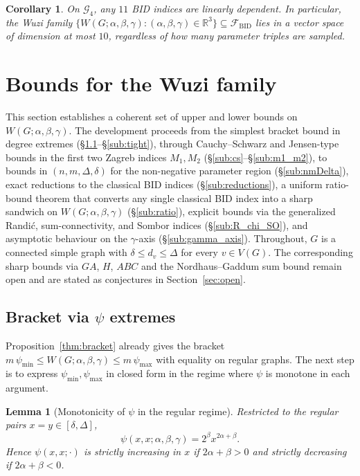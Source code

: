 \documentclass[11pt,a4paper]{article}
\newtheorem{lemma}[theorem]{Lemma}
\newtheorem{corollary}[theorem]{Corollary}
\theoremstyle{definition}
\newcommand{\Wuzi}{W(G;\alpha,\beta,\gamma)}
\newcommand{\bid}{\mathcal{F}_{\mathrm{BID}}}
\begin{document}
\begin{corollary}\label{cor:bid_redundancy}
On $\mathcal{G}_4$, any $11$ BID indices are linearly dependent.
In particular, the Wuzi family
$\{\Wuzi:(\alpha,\beta,\gamma)\in\mathbb{R}^3\}\subseteq\bid$ lies
in a vector space of dimension at most $10$, regardless of how
many parameter triples are sampled.
\end{corollary}

\section{Bounds for the Wuzi family}\label{sec:bounds}

This section establishes a coherent set of upper and lower bounds on
$\Wuzi$. The development proceeds from the simplest bracket bound
in degree extremes (\S\ref{sub:bracket_psi}--\S\ref{sub:tight}),
through Cauchy--Schwarz and Jensen-type bounds in the first two
Zagreb indices $M_1, M_2$
(\S\ref{sub:cs}--\S\ref{sub:m1_m2}), to bounds in $(n, m, \Delta,
\delta)$ for the non-negative parameter region
(\S\ref{sub:nmDelta}), exact reductions to the classical BID
indices (\S\ref{sub:reductions}), a uniform ratio-bound theorem
that converts any single classical BID index into a sharp sandwich
on $\Wuzi$ (\S\ref{sub:ratio}), explicit bounds via the
generalized Randi\'c, sum-connectivity, and Sombor indices
(\S\ref{sub:R_chi_SO}), and asymptotic behaviour on the
$\gamma$-axis (\S\ref{sub:gamma_axis}). Throughout, $G$ is a
connected simple graph with $\delta\le d_v\le\Delta$ for every
$v\in V(G)$. The corresponding sharp bounds via $GA$, $H$, $ABC$
and the Nordhaus--Gaddum sum bound remain open and are stated as
conjectures in Section~\ref{sec:open}.

\subsection{Bracket via $\psi$ extremes}\label{sub:bracket_psi}

Proposition~\ref{thm:bracket} already gives the bracket
$m\,\psi_{\min}\le \Wuzi\le m\,\psi_{\max}$ with equality on
regular graphs. The next step is to express $\psi_{\min},\psi_{\max}$
in closed form in the regime where $\psi$ is monotone in each
argument.

\begin{lemma}[Monotonicity of $\psi$ in the regular regime]
\label{lem:psi_mono_regular}
Restricted to the regular pairs $x=y\in[\delta,\Delta]$,
\[\psi(x,x;\alpha,\beta,\gamma)=2^{\beta} x^{2\alpha+\beta}.\]
Hence $\psi(x,x;\cdot)$ is strictly increasing in $x$ if
$2\alpha+\beta>0$ and strictly decreasing if $2\alpha+\beta<0$.
\end{lemma}
\end{document}

